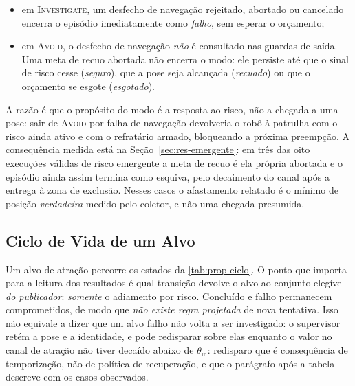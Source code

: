 \begin{itemize}
    \item em \textsc{Investigate}, um desfecho de navegação rejeitado, abortado ou
    cancelado encerra o episódio imediatamente como \emph{falho}, sem esperar o
    orçamento;
    \item em \textsc{Avoid}, o desfecho de navegação \emph{não} é consultado nas
    guardas de saída. Uma meta de recuo abortada não encerra o modo: ele persiste até
    que o sinal de risco cesse (\emph{seguro}), que a pose seja alcançada
    (\emph{recuado}) ou que o orçamento se esgote (\emph{esgotado}).
\end{itemize}

A razão é que o propósito do modo é a resposta ao risco, não a chegada a uma pose: sair
de \textsc{Avoid} por falha de navegação devolveria o robô à patrulha com o risco ainda
ativo e com o refratário armado, bloqueando a próxima preempção. A consequência medida
está na Seção~\ref{sec:res-emergente}: em três das oito execuções válidas de risco
emergente a meta de recuo é ela própria abortada e o episódio ainda assim termina como
esquiva, pelo decaimento do canal após a entrega à zona de exclusão. Nesses casos o
afastamento relatado é o mínimo de posição \emph{verdadeira} medido pelo coletor, e não
uma chegada presumida.

\subsection{Ciclo de Vida de um Alvo}
\label{sec:prop-ciclo-alvo}

Um alvo de atração percorre os estados da \autoref{tab:prop-ciclo}. %
O ponto que importa
para a leitura dos resultados é qual transição devolve o alvo ao conjunto elegível
\emph{do publicador}: \emph{somente} o adiamento por risco. Concluído e falho
permanecem comprometidos, de modo que \emph{não existe regra projetada} de nova
tentativa. Isso não equivale a dizer que um alvo falho não volta a ser investigado: o
supervisor retém a pose e a identidade, e pode redisparar sobre elas enquanto o valor
no canal de atração não tiver decaído abaixo de $\theta_{\text{in}}$: redisparo que
é consequência de temporização, não de política de recuperação, e que o parágrafo após
a tabela descreve com os casos observados.

